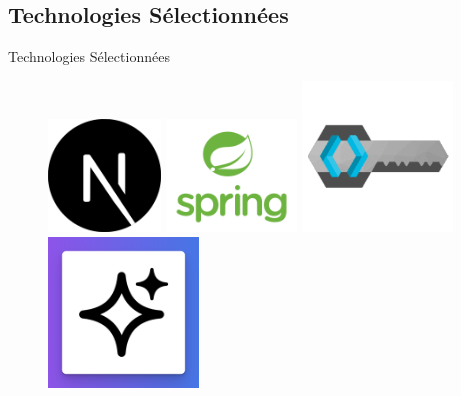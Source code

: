 \documentclass{beamer}
\begin{document}
\subsection{Technologies Sélectionnées}
\begin{frame}{Technologies Sélectionnées}
    \begin{figure}[htpb]
        \centering
        \begin{minipage}{0.32\textwidth}
            \centering
            \includegraphics[height=3cm]{pic/next.png}
        \end{minipage}%
        \hspace{0.03\textwidth}
        \begin{minipage}{0.32\textwidth}
            \centering
            \includegraphics[height=3cm]{pic/spring.png}
        \end{minipage}%
        \hspace{0.03\textwidth}
        \begin{minipage}{0.32\textwidth}
            \centering
            \includegraphics[height=4cm]{pic/keycloak.png}
        \end{minipage}
         \hspace{0.03\textwidth}
        \begin{minipage}{0.32\textwidth}
            \centering
            \includegraphics[height=4cm]{pic/ia.png}
        \end{minipage}
    \end{figure}
\end{frame}
\end{document}
